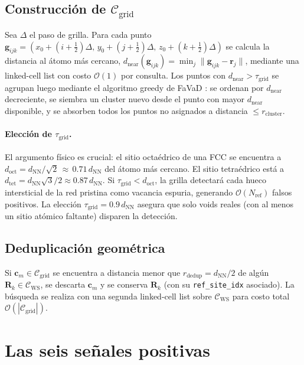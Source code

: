 \documentclass[11pt,a4paper]{article}
\theoremstyle{remark}
\begin{document}
\subsection{Construcción de $\mathcal{C}_\text{grid}$}

Sea $\Delta$ el paso de grilla. Para cada punto
$\mathbf{g}_{ijk} = (x_0 + (i+\tfrac{1}{2})\Delta,\,y_0 + (j+\tfrac{1}{2})\Delta,\,z_0 + (k+\tfrac{1}{2})\Delta)$
se calcula la distancia al átomo más cercano,
$d_\text{near}(\mathbf{g}_{ijk}) = \min_{j} \|\mathbf{g}_{ijk} - \mathbf{r}_j\|$,
mediante una linked-cell list con costo $\mathcal{O}(1)$ por consulta.
Los puntos con $d_\text{near} > \tau_\text{grid}$ se agrupan luego
mediante el algoritmo greedy de FaVaD \cite{Toussaint2020}: se ordenan
por $d_\text{near}$ decreciente, se siembra un cluster nuevo desde el
punto con mayor $d_\text{near}$ disponible, y se absorben todos los
puntos no asignados a distancia $\leq r_\text{cluster}$.

\paragraph{Elección de $\tau_\text{grid}$.} El argumento físico es
crucial: el sitio octaédrico de una FCC se encuentra a
$d_\text{oct} = d_\text{NN}/\sqrt{2}\,\approx\,0.71\,d_\text{NN}$ del
átomo más cercano. El sitio tetraédrico está a
$d_\text{tet} = d_\text{NN}\sqrt{3}/2 \approx 0.87\,d_\text{NN}$. Si
$\tau_\text{grid} < d_\text{oct}$, la grilla detectará cada hueco
intersticial de la red pristina como vacancia espuria, generando
$\mathcal{O}(N_\text{ref})$ falsos positivos. La elección
$\tau_\text{grid} = 0.9\,d_\text{NN}$ asegura que solo voids reales
(con al menos un sitio atómico faltante) disparen la detección.

\subsection{Deduplicación geométrica}

Si $\mathbf{c}_m \in \mathcal{C}_\text{grid}$ se encuentra a distancia
menor que $r_\text{dedup} = d_\text{NN}/2$ de algún
$\mathbf{R}_k \in \mathcal{C}_\text{WS}$, se descarta $\mathbf{c}_m$
y se conserva $\mathbf{R}_k$ (con su \texttt{ref\_site\_idx}
asociado). La búsqueda se realiza con una segunda linked-cell list
sobre $\mathcal{C}_\text{WS}$ para costo total
$\mathcal{O}(|\mathcal{C}_\text{grid}|)$.

\section{Las seis señales positivas}
\end{document}
